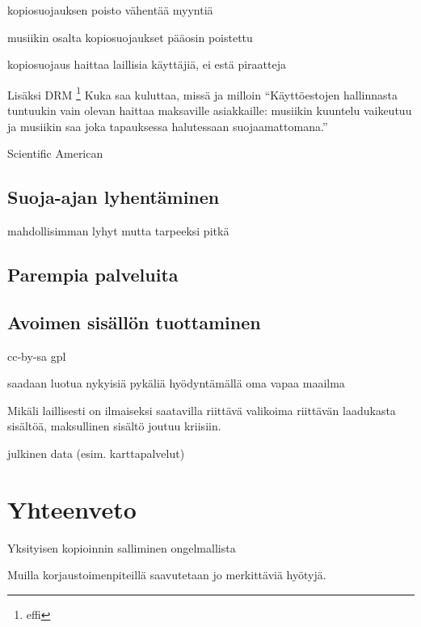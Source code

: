 \documentclass[titlepage,12pt]{article}
\begin{document}
kopiosuojauksen poisto vähentää myyntiä

musiikin osalta kopiosuojaukset pääosin poistettu

kopiosuojaus haittaa laillisia käyttäjiä, ei estä piraatteja

Lisäksi DRM \footnote{effi} Kuka saa kuluttaa, missä ja milloin
``Käyttöestojen hallinnasta tuntuukin vain olevan haittaa maksaville
asiakkaille: musiikin kuuntelu vaikeutuu ja musiikin saa joka
tapauksessa halutessaan suojaamattomana.''

Scientific American

\subsection{Suoja-ajan lyhentäminen}

mahdollisimman lyhyt mutta tarpeeksi pitkä

\subsection{Parempia palveluita}

\subsection{Avoimen sisällön tuottaminen}

cc-by-sa gpl

saadaan luotua nykyisiä pykäliä hyödyntämällä oma vapaa maailma

Mikäli laillisesti on ilmaiseksi saatavilla riittävä valikoima
riittävän laadukasta sisältöä, maksullinen sisältö joutuu kriisiin.

julkinen data (esim. karttapalvelut)

\section{Yhteenveto}

Yksityisen kopioinnin salliminen ongelmallista

Muilla korjaustoimenpiteillä saavutetaan jo merkittäviä hyötyjä.

\pagebreak

\end{document}
